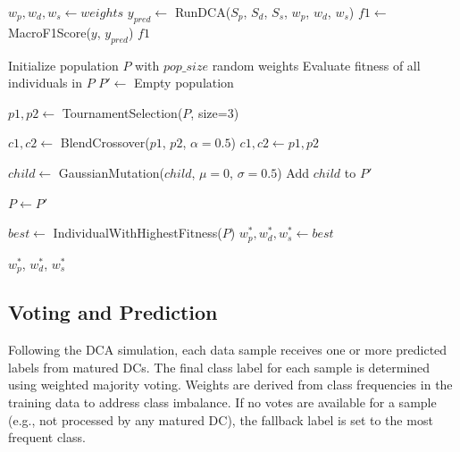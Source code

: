 \documentclass[conference]{IEEEtran}
\begin{document}
\begin{algorithm}
\caption{GA-Based Weight Optimization}
\label{alg:ga_optimization}
\begin{algorithmic}[1]

    \State $w_p, w_d, w_s \gets weights$
    \State $y_{pred} \gets$ RunDCA($S_p$, $S_d$, $S_s$, $w_p$, $w_d$, $w_s$)
    \State $f1 \gets$ MacroF1Score($y$, $y_{pred}$)
    \State \Return $f1$
\EndFunction

\State Initialize population $P$ with $pop\_size$ random weights
    \State Evaluate fitness of all individuals in $P$
    \State $P' \gets$ Empty population

        \State $p1, p2 \gets$ TournamentSelection($P$, size=3)

         
            \State $c1, c2 \gets$ BlendCrossover($p1$, $p2$, $\alpha=0.5$)
        \Else
            \State $c1, c2 \gets p1, p2$
        \EndIf

             
                \State $child \gets$ GaussianMutation($child$, $\mu=0$, $\sigma=0.5$)
            \EndIf
            \State Add $child$ to $P'$
        \EndFor
    \EndWhile

    \State $P \gets P'$
\EndFor

\State $best \gets$ IndividualWithHighestFitness($P$)
\State $w_p^*, w_d^*, w_s^* \gets best$

\State \Return $w_p^*$, $w_d^*$, $w_s^*$
\end{algorithmic}
\end{algorithm}

\subsection{Voting and Prediction}

Following the DCA simulation, each data sample receives one or more
predicted labels from matured DCs. The final class label for each
sample is determined using weighted majority voting. Weights are
derived from class frequencies in the training data to address class
imbalance. If no votes are available for a sample (e.g., not
processed by any matured DC), the fallback label is set to the most
frequent class.
\end{document}
